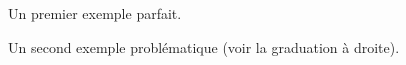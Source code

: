 \documentclass[varwidth, border = 3pt]{standalone}
\begin{document}
Un premier exemple parfait.



\medskip


Un second exemple problématique (voir la graduation à droite).

\end{document}
